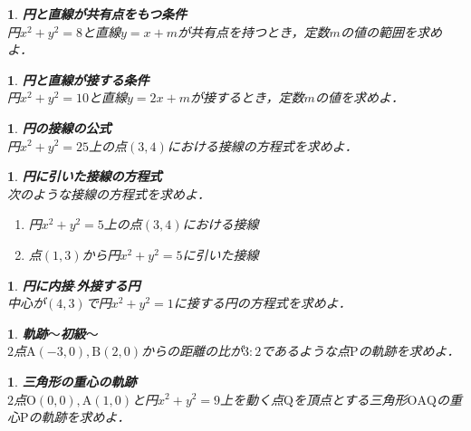 \documentclass[10pt,
fleqn,
dvipdfmx,
uplatex
]{jsarticle}
\newtheorem{question}[Question]{}
\begin{document}
\begin{question}{\bf\boldmath 円と直線が共有点をもつ条件}\\
円$x^2+y^2=8$と直線$y=x+m$が共有点を持つとき，定数$m$の値の範囲を求めよ．
\end{question}



\begin{question}{\bf\boldmath 円と直線が接する条件}\\
円$x^2+y^2={10}$と直線$y=2x+m$が接するとき，定数$m$の値を求めよ．
\end{question}



\begin{question}{\bf\boldmath 円の接線の公式}\\
円$x^2+y^2={25}$上の点$\left(3,4\right)$における接線の方程式を求めよ．
\end{question}



\begin{question}{\bf\boldmath 円に引いた接線の方程式}\\
次のような接線の方程式を求めよ．
\begin{enumerate}
\item 円$x^2+y^2=5$上の点$\left(3,4\right)$における接線
\item 点$\left(1,3\right)$から円$x^2+y^2=5$に引いた接線
\end{enumerate}

\end{question}



\begin{question}{\bf\boldmath 円に内接$\cdot$外接する円}\\
中心が$\left(4,3\right)$で円$x^2+y^2=1$に接する円の方程式を求めよ．
\end{question}



\begin{question}{\bf\boldmath 軌跡$〜$初級$〜$}\\
$2$点$\text{A}\left(-3,0\right), \text{B}\left(2,0\right)$からの距離の比が$3:2$であるような点$\text{P}$の軌跡を求めよ．
\end{question}



\begin{question}{\bf\boldmath 三角形の重心の軌跡}\\
$2$点$\text{O}\left(0,0\right), \text{A}\left(1,0\right)$と円$x^2+y^2=9$上を動く点$\text{Q}$を頂点とする三角形$\text{OAQ}$の重心$\text{P}$の軌跡を求めよ．
\end{question}
\end{document}

